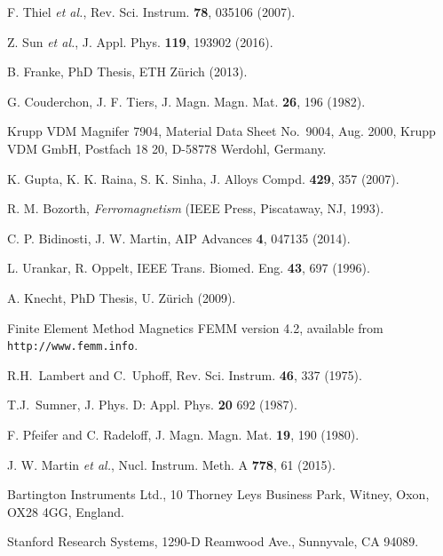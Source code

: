 \documentclass[review,number,sort&compress]{elsarticle}
\begin{document}
\begin{thebibliography}{00}
 F. Thiel {\it et al.}, Rev. Sci. Instrum. {\bf 78}, 035106 (2007).

 Z. Sun {\it et al.}, J. Appl. Phys. {\bf
  119}, 193902 (2016).

 B. Franke, PhD Thesis, ETH Z\"urich (2013).

 G. Couderchon, J. F. Tiers,
  J. Magn. Magn. Mat. {\bf 26}, 196 (1982).

 Krupp VDM Magnifer 7904, Material Data Sheet
  No.~9004, Aug. 2000, Krupp VDM GmbH, Postfach 18 20, D-58778
  Werdohl, Germany.

 K. Gupta, K. K. Raina, S. K. Sinha, J. Alloys
  Compd. {\bf 429}, 357 (2007).

 R. M. Bozorth, {\it Ferromagnetism} (IEEE Press,
  Piscataway, NJ, 1993).

 C. P. Bidinosti, J. W. Martin, AIP Advances
  {\bf 4}, 047135 (2014).

 L. Urankar, R. Oppelt, IEEE
  Trans. Biomed. Eng. {\bf 43}, 697 (1996).

 A. Knecht, PhD Thesis, U. Z\"urich (2009).

 Finite Element Method Magnetics FEMM version 4.2,
  available from {\tt http://www.femm.info}.


 R.H.\ Lambert and C.\ Uphoff, Rev. Sci. Instrum. {\bf 46},  337 (1975).

 T.J.\ Sumner,  J. Phys. D: Appl. Phys. {\bf 20} 692 (1987).






 F. Pfeifer and C. Radeloff,
  J. Magn. Magn. Mat. {\bf 19}, 190 (1980).

 J. W. Martin {\it et al.},
  Nucl. Instrum. Meth. A {\bf 778}, 61 (2015).

 Bartington Instruments Ltd., 10 Thorney Leys
  Business Park, Witney, Oxon, OX28 4GG, England.

 Stanford Research Systems, 1290-D Reamwood Ave.,
  Sunnyvale, CA 94089.


\end{thebibliography}
\end{document}
